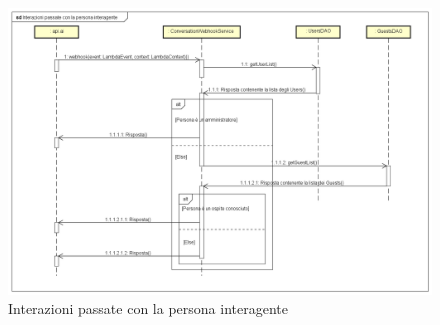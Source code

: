 \begin{figure}[h] \centering \includegraphics[width=\textwidth,height=\textheight,keepaspectratio]{images/diagrams/back-end/Ufficial_Backend/Interazionipassateconlapersonainteragente.png}
\caption{Interazioni passate con la persona interagente}
\end{figure}
\newpage
